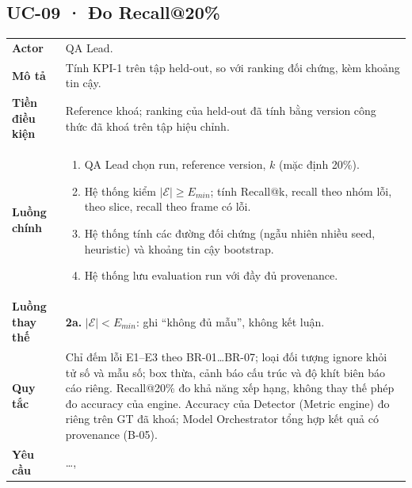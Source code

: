 \subsection*{UC-09 · Đo Recall@20\%}
\begin{xltabular}{\linewidth}{@{}>{\bfseries}L{3.2cm}Y@{}}
\toprule
Actor & QA Lead.\\
Mô tả & Tính KPI-1 trên tập held-out, so với ranking đối chứng, kèm khoảng tin cậy.\\
Tiền điều kiện & Reference khoá; ranking của held-out đã tính bằng version công thức đã khoá trên tập hiệu chỉnh.\\
Luồng chính &
\begin{enumerate}[nosep]
  \item QA Lead chọn run, reference version, \(k\) (mặc định 20\%).
  \item Hệ thống kiểm \(|\mathcal{E}| \ge E_{min}\); tính Recall@k, recall theo nhóm lỗi, theo slice, recall theo frame có lỗi.
  \item Hệ thống tính các đường đối chứng (ngẫu nhiên nhiều seed, heuristic) và khoảng tin cậy bootstrap.
  \item Hệ thống lưu evaluation run với đầy đủ provenance.
\end{enumerate}\\
Luồng thay thế & \textbf{2a.} \(|\mathcal{E}| < E_{min}\): ghi ``không đủ mẫu'', không kết luận.\\
Quy tắc & Chỉ đếm lỗi E1–E3 theo BR-01…BR-07; loại đối tượng ignore khỏi tử số và mẫu số; box thừa, cảnh báo cấu trúc và độ khít biên báo cáo riêng.\newline
Recall@20\% đo khả năng xếp hạng, không thay thế phép đo accuracy của engine. Accuracy của Detector (Metric engine) đo riêng trên GT đã khoá; Model Orchestrator tổng hợp kết quả có provenance (B-05).\\
Yêu cầu & …, \\
\bottomrule
\end{xltabular}

